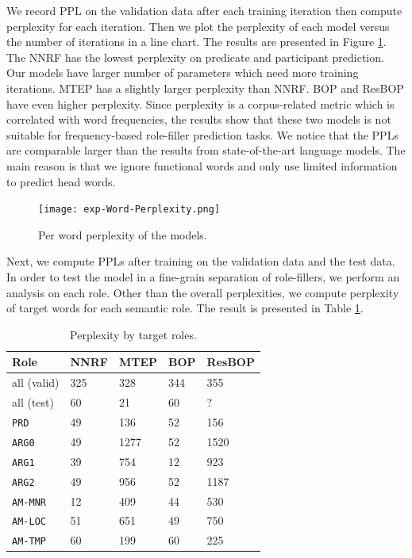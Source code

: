 \documentclass[a4paper]{article}
\begin{document}
We record PPL on the validation data after each training iteration then compute perplexity for each iteration. Then we plot the perplexity of each model versus the number of iterations in a line chart. The results are presented in Figure \ref{fig:exp-Word-Perplexity}. The NNRF has the lowest perplexity on predicate and participant prediction. Our models have larger number of parameters which need more training iterations. MTEP has a slightly larger perplexity than NNRF. BOP and ResBOP have even higher perplexity. Since perplexity is a corpus-related metric which is correlated with word frequencies, the results show that these two models is not suitable for frequency-based role-filler prediction tasks. We notice that the PPLs are comparable larger than the results from state-of-the-art language models. The main reason is that we ignore functional words and only use limited information to predict head words. 

\begin{figure}[p]
\centering
\texttt{[image: exp-Word-Perplexity.png]}
\caption{\label{fig:exp-Word-Perplexity} Per word perplexity of the models.}
\end{figure}

Next, we compute PPLs after training on the validation data and the test data. In order to test the model in a fine-grain separation of role-fillers, we perform an analysis on each role. Other than the overall perplexities, we compute perplexity of target words for each semantic role. The result is presented in Table \ref{tab:eval-perplexity-role}. 

\begin{table}[t]
\centering
\begin{tabular}{lllll}
\textbf{Role} & \textbf{NNRF} & \textbf{MTEP} & \textbf{BOP}  & \textbf{ResBOP} \\ \hline
all (valid)   &   325&  328   &   344  &   355    \\  \hline
all (test)      &   60 &   21      &   60  &   ?       \\
\texttt{PRD}    &   49 &   136      &   52  &   156     \\
\texttt{ARG0}   &   49 &   1277      &   52  &   1520    \\
\texttt{ARG1}   &   39 &   754      &   12  &   923     \\
\texttt{ARG2}   &   49 &   956      &   52  &   1187    \\
\texttt{AM-MNR} &   12 &   409      &   44  &   530     \\
\texttt{AM-LOC} &   51 &   651      &   49  &   750     \\
\texttt{AM-TMP} &   60 &   199      &   60  &   225     \\
\end{tabular}
\caption{\label{tab:eval-perplexity-role} Perplexity by target roles.}
\end{table}
\end{document}
